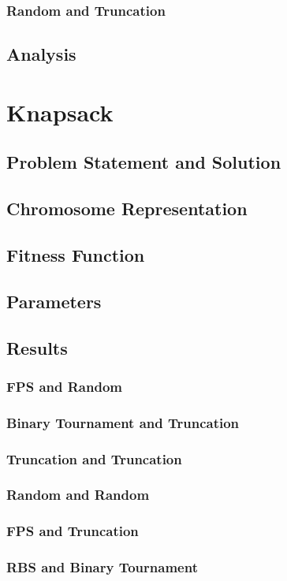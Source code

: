 \documentclass{article}
\begin{document}
\subsubsection {Random and Truncation}
\subsection{Analysis}

\section{Knapsack}
\subsection{Problem Statement and Solution}
\subsection{Chromosome Representation}
\subsection{Fitness Function}
\subsection{Parameters}
\subsection{Results} 
\subsubsection {FPS and Random}
\subsubsection {Binary Tournament and Truncation}
\subsubsection {Truncation and Truncation}
\subsubsection {Random and Random}
\subsubsection {FPS and Truncation}
\subsubsection {RBS and Binary Tournament}
\end{document}

